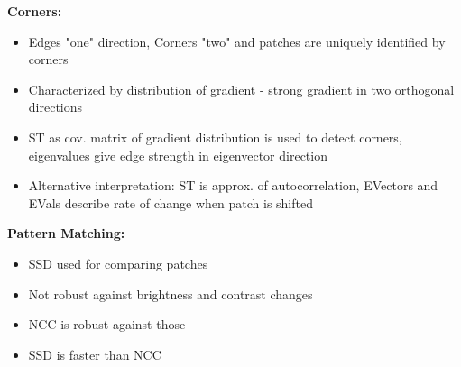 \textbf{Corners:} \begin{itemize}
    \item Edges "one" direction, Corners "two" and patches are uniquely identified by corners
    \item Characterized by distribution of gradient - strong gradient in two orthogonal directions
    \item ST as cov. matrix of gradient distribution is used to detect corners, eigenvalues give edge strength in eigenvector direction
    \item Alternative interpretation: ST is approx. of autocorrelation, EVectors and EVals describe rate of change when patch is shifted
\end{itemize}

\textbf{Pattern Matching:} \begin{itemize}
    \item SSD used for comparing patches
    \item Not robust against brightness and contrast changes
    \item NCC  is robust against those
    \item SSD is faster than NCC
\end{itemize}





















